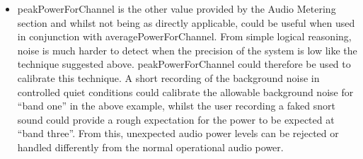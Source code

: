 \begin{itemize}
\item peakPowerForChannel is the other value provided by the Audio Metering section and whilst not being as directly applicable, could be useful when used in conjunction with averagePowerForChannel. From simple logical reasoning, noise is much harder to detect when the precision of the system is low like the technique suggested above. peakPowerForChannel could therefore be used to calibrate this technique. A short recording of the background noise in controlled quiet conditions could calibrate the allowable background noise for “band one” in the above example, whilst the user recording a faked snort sound could provide a rough expectation for the power to be expected at “band three”. From this, unexpected audio power levels can be rejected or handled differently from the normal operational audio power.
\end{itemize}